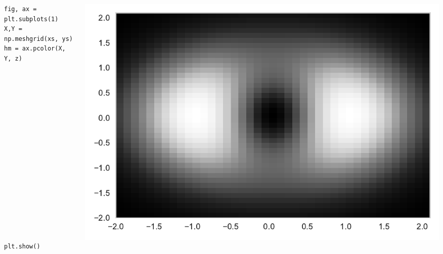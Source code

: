\documentclass{beamer}
\begin{document}
\begin{frame}[fragile]
\tiny{
\begin{columns}
\begin{column}{0.45\textwidth}
\begin{verbatim}
fig, ax = plt.subplots(1)
X,Y = np.meshgrid(xs, ys)
hm = ax.pcolor(X, Y, z)


















plt.show()
\end{verbatim}
\end{column}
\begin{column}{0.55\textwidth}
\includegraphics[width=\textwidth]{../heatmap_2.pdf}
\end{column}
\end{columns}
}
\end{frame}
\end{document}
